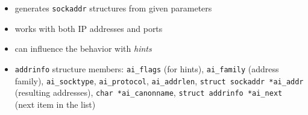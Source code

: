 
\label{GETADDRINF}

\begin{slide}

\begin{itemize}
\item generates \texttt{sockaddr} structures from given parameters
\item works with both IP addresses and ports
\item can influence the behavior with \emph{hints}

\item \texttt{addrinfo} structure members:
\texttt{ai\_flags} (for hints), \texttt{ai\_family} (address family),
\texttt{ai\_socktype}, \texttt{ai\_protocol}, \texttt{ai\_addrlen},
\texttt{struct sockaddr *ai\_addr} (resulting addresses),
\texttt{char *ai\_canonname},
\texttt{struct addrinfo *ai\_next} (next item in the list)
\end{itemize}
\end{slide}

